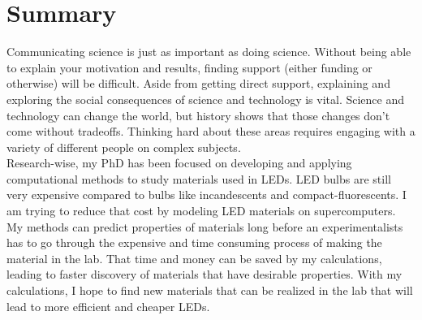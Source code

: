\section{Summary}
Communicating science is just as important as doing science. Without being able
to explain your motivation and results, finding support (either funding or
otherwise) will be difficult. Aside from getting direct support, explaining and
exploring the social consequences of science and technology is vital. Science
and technology can change the world, but history shows that those changes don’t
come without tradeoffs. Thinking hard about these areas requires engaging with a
variety of different people on complex subjects. \\

Research-wise, my PhD has been focused on developing and applying computational
methods to study materials used in LEDs. LED bulbs are still very expensive
compared to bulbs like incandescents and compact-fluorescents. I am trying to
reduce that cost by modeling LED materials on supercomputers. My methods can
predict properties of materials long before an experimentalists has to go
through the expensive and time consuming process of making the material in the
lab. That time and money can be saved by my calculations, leading to faster
discovery of materials that have desirable properties. With my calculations, I
hope to find new materials that can be realized in the lab that will lead to
more efficient and cheaper LEDs.
